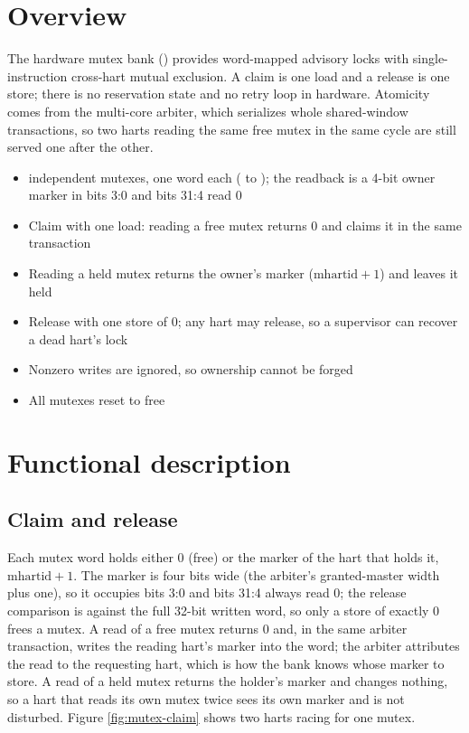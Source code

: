 \section{Overview}

The hardware mutex bank () provides \NumMutexesWord{} word-mapped advisory locks with single-instruction cross-hart mutual exclusion. A claim is one load and a release is one store; there is no reservation state and no retry loop in hardware. Atomicity comes from the multi-core arbiter, which serializes whole shared-window transactions, so two harts reading the same free mutex in the same cycle are still served one after the other.

\begin{itemize}
	\item \NumMutexes{} independent mutexes, one word each ( to ); the readback is a 4-bit owner marker in bits 3:0 and bits 31:4 read 0
	\item Claim with one load: reading a free mutex returns 0 and claims it in the same transaction
	\item Reading a held mutex returns the owner's marker ($\mathrm{mhartid} + 1$) and leaves it held
	\item Release with one store of 0; any hart may release, so a supervisor can recover a dead hart's lock
	\item Nonzero writes are ignored, so ownership cannot be forged
	\item All mutexes reset to free
\end{itemize}

\section{Functional description}

\subsection{Claim and release}

Each mutex word holds either 0 (free) or the marker of the hart that holds it, $\mathrm{mhartid} + 1$. The marker is four bits wide (the arbiter's granted-master width plus one), so it occupies bits 3:0 and bits 31:4 always read 0; the release comparison is against the full 32-bit written word, so only a store of exactly 0 frees a mutex. A read of a free mutex returns 0 and, in the same arbiter transaction, writes the reading hart's marker into the word; the arbiter attributes the read to the requesting hart, which is how the bank knows whose marker to store. A read of a held mutex returns the holder's marker and changes nothing, so a hart that reads its own mutex twice sees its own marker and is not disturbed. Figure \ref{fig:mutex-claim} shows two harts racing for one mutex.

